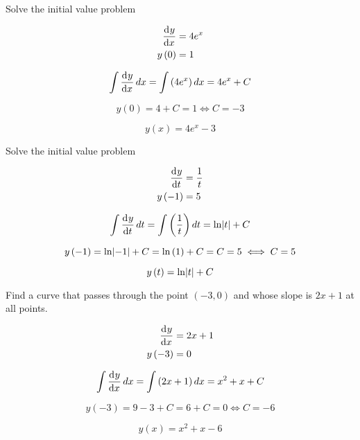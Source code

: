 \documentclass[a4paper, titlepage]{article}
\begin{document}
\begin{Exercise}

Solve the initial value problem

    \begin{align*}
        \dod{y}{x} &= 4e^x \\
        y \left( 0 \right) &= 1
    \end{align*}
    \cite{anton-bivens-davis}
\end{Exercise}

\begin{Answer}
	\[\int \dod{y}{x} dx = \int \left( 4e^x \right) dx = 4e^x + C\]

    \[y \left( 0 \right) = 4 + C = 1 \iff C = -3\]

    \[y \left( x \right) = 4e^x - 3\]
\end{Answer}

\begin{Exercise}

Solve the initial value problem

    \begin{align*}
        \dod{y}{t} &= \frac{1}{t} \\
        y \left( -1 \right) &= 5
    \end{align*}
    \cite{anton-bivens-davis}
\end{Exercise}

\begin{Answer}
	\[\int \dod{y}{t} dt = \int \left( \frac{1}{t} \right) dt = \ln \abs{t} + C\]

    \[y \left( -1 \right) = \ln \abs{-1} + C = \ln \left( 1 \right) + C = C = 5 \iff C = 5\]

    \[y \left( t \right) = \ln \abs{t} + C\]
\end{Answer}

\begin{Exercise}

Find a curve that passes through the point \((-3, 0)\) and whose slope is
\(2x + 1\) at all points.

    \begin{align*}
        \dod{y}{x} &= 2x + 1 \\
        y \left( -3 \right) &= 0
    \end{align*}
    \cite{anton-bivens-davis}
\end{Exercise}

\begin{Answer}
	\[\int \dod{y}{x} dx = \int \left( 2x + 1 \right) dx = x^2 + x + C\]

    \[y \left( -3 \right) = 9 - 3 + C = 6 + C = 0 \iff C = -6\]

    \[y \left( x \right) = x^2 + x - 6\]
\end{Answer}
\end{document}
